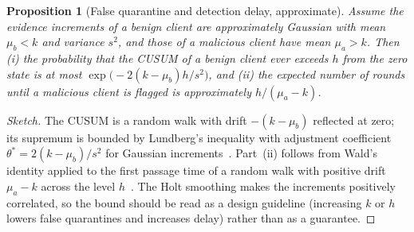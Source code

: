 \documentclass[journal]{IEEEtran}
\newtheorem{proposition}{Proposition}
\begin{document}
\begin{proposition}[False quarantine and detection delay, approximate]\label{prop:cusum}
Assume the evidence increments of a benign client are approximately Gaussian with mean $\mu_b<k$ and variance $s^2$, and those of a malicious client have mean $\mu_a>k$. Then (i) the probability that the CUSUM of a benign client ever exceeds $h$ from the zero state is at most $\exp\!\big(-2(k-\mu_b)h/s^2\big)$, and (ii) the expected number of rounds until a malicious client is flagged is approximately $h/(\mu_a-k)$.
\end{proposition}
\begin{proof}[Sketch]
The CUSUM is a random walk with drift $-(k-\mu_b)$ reflected at zero; its supremum is bounded by Lundberg's inequality with adjustment coefficient $\theta^\ast=2(k-\mu_b)/s^2$ for Gaussian increments~\cite{siegmund}. Part~(ii) follows from Wald's identity applied to the first passage time of a random walk with positive drift $\mu_a-k$ across the level $h$~\cite{page,siegmund}. The Holt smoothing makes the increments positively correlated, so the bound should be read as a design guideline (increasing $k$ or $h$ lowers false quarantines and increases delay) rather than as a guarantee.
\end{proof}
\end{document}

